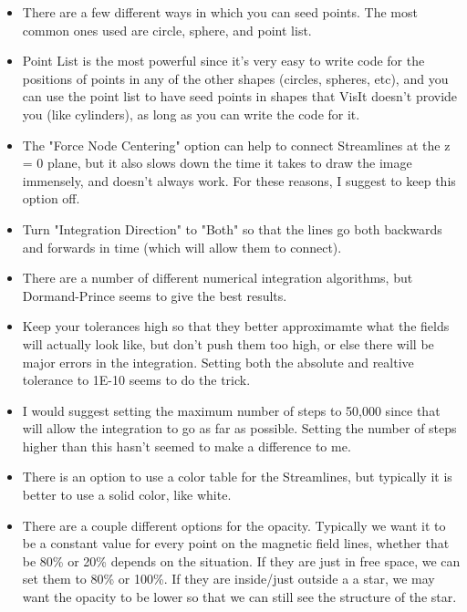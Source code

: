\documentclass[english]{article}
\begin{document}
    \begin{itemize}
        \item There are a few different ways in which you can seed points. The most common ones used are 
              circle, sphere, and point list.
        \item Point List is the most powerful since it's very easy to write code for the positions of points
              in any of the other shapes (circles, spheres, etc), and you can use the point list to have seed
              points in shapes that VisIt doesn't provide you (like cylinders), as long as you can write the
              code for it.
        \item The "Force Node Centering" option can help to connect Streamlines at the z = 0 plane, but it also
              slows down the time it takes to draw the image immensely, and doesn't always work. For these 
              reasons, I suggest to keep this option off.
        \item Turn "Integration Direction" to "Both" so that the lines go both backwards and forwards in time 
              (which will allow them to connect).
        \item There are a number of different numerical integration algorithms, but Dormand-Prince seems to 
              give the best results.
        \item Keep your tolerances high so that they better approximamte what the fields will actually look 
              like, but don't push them too high, or else there will be major errors in the integration. Setting
              both the absolute and realtive tolerance to 1E-10 seems to do the trick.
        \item I would suggest setting the maximum number of steps to 50,000 since that will allow the integration
              to go as far as possible. Setting the number of steps higher than this hasn't seemed to make a 
              difference to me.
        \item There is an option to use a color table for the Streamlines, but typically it is better to use a 
              solid color, like white.
        \item There are a couple different options for the opacity. Typically we want it to be a constant value
              for every point on the magnetic field lines, whether that be 80\% or 20\% depends on the situation.
              If they are just in free space, we can set them to 80\% or 100\%. If they are inside/just outside a
              a star, we may want the opacity to be lower so that we can still see the structure of the star.

\end{itemize}
\end{document}
